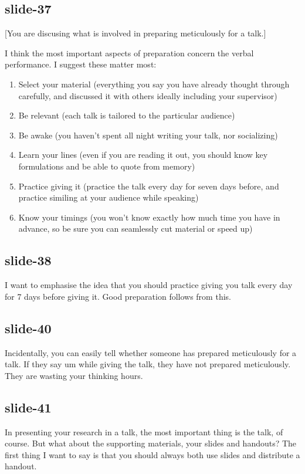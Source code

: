 \documentclass[12pt,\papersize]{extarticle}
\begin{document}
\subsection{slide-37}
[You are discusing what is involved in preparing meticulously for a talk.]
 
I think the most important aspects of preparation concern the verbal performance.
I suggest these matter most:
\begin{enumerate}
\item Select your material (everything you say you have already thought through carefully, and discussed it with others ideally including your supervisor)
\item Be relevant (each talk is tailored to the particular audience)
\item Be awake (you haven't spent all night writing your talk, nor socializing)
\item Learn your lines (even if you are reading it out, you should know key formulations and be able to quote from memory)
\item Practice giving it  (practice the talk every day for seven days before, and practice similing at your audience while speaking) 
\item Know your timings (you won't know exactly how much time you have in advance, so be sure you can seamlessly cut material or speed up)
\end{enumerate}
 
\subsection{slide-38}
I want to emphasise the idea that you should practice giving you talk every day for 7 days before 
giving it.
Good preparation follows from this.
 
\subsection{slide-40}
Incidentally, you can easily tell whether someone has prepared meticulously for a talk.
If they say um while giving the talk, they have not prepared meticulously.
They are wasting your thinking hours.
 
\subsection{slide-41}
In presenting your research in a talk, the most important thing is the talk, of course.
But what about the supporting materials, your slides and handouts?
The first thing I want to say is that you should always both use slides and distribute a 
handout.
 
\end{document}

